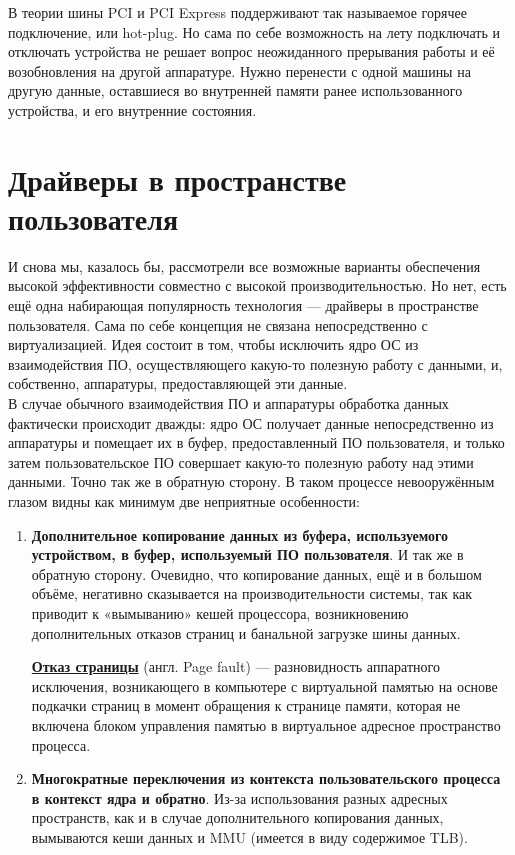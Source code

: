 \documentclass[14pt, a4paper]{article}
\begin{document}
В теории шины PCI и PCI Express поддерживают так называемое горячее подключение, или hot-plug.
Но сама по себе возможность на лету подключать и отключать устройства не решает вопрос
неожиданного прерывания работы и её возобновления на другой аппаратуре. Нужно перенести с
одной машины на другую данные, оставшиеся во внутренней памяти ранее использованного
устройства, и его внутренние состояния.

\section*{Драйверы в пространстве пользователя} 

И снова мы, казалось бы, рассмотрели все возможные варианты обеспечения высокой
эффективности совместно с высокой производительностью. Но нет, есть ещё одна набирающая
популярность технология — драйверы в пространстве пользователя. Сама по себе концепция не
связана непосредственно с виртуализацией. Идея состоит в том, чтобы исключить ядро ОС из
взаимодействия ПО, осуществляющего какую-то полезную работу с данными, и, собственно,
аппаратуры, предоставляющей эти данные.\\

В случае обычного взаимодействия ПО и аппаратуры обработка данных фактически происходит
дважды: ядро ОС получает данные непосредственно из аппаратуры и помещает их в буфер,
предоставленный ПО пользователя, и только затем пользовательское ПО совершает какую-то
полезную работу над этими данными. Точно так же в обратную сторону. В таком процессе
невооружённым глазом видны как минимум две неприятные особенности:

\begin{enumerate}
    \item \textbf{Дополнительное копирование данных из буфера, используемого устройством, в буфер,
    используемый ПО пользователя}. И так же в обратную сторону. Очевидно, что копирование
    данных, ещё и в большом объёме, негативно сказывается на производительности системы,
    так как приводит к «вымыванию» кешей процессора, возникновению дополнительных отказов
    страниц и банальной загрузке шины данных.

\noindent   \href{https://ru.wikipedia.org/wiki/Отказ_страницы}{\textbf{Отказ страницы}} (англ. Page fault) — разновидность аппаратного исключения, возникающего в
\noindent компьютере с виртуальной памятью на основе подкачки страниц в момент обращения к странице 
памяти, которая не включена блоком управления памятью в виртуальное адресное пространство
процесса.
\item \textbf{Многократные переключения из контекста пользовательского процесса в контекст ядра
и обратно}. Из-за использования разных адресных пространств, как и в случае
дополнительного копирования данных, вымываются кеши данных и MMU (имеется в виду
содержимое TLB).
\end{enumerate}
\end{document}
